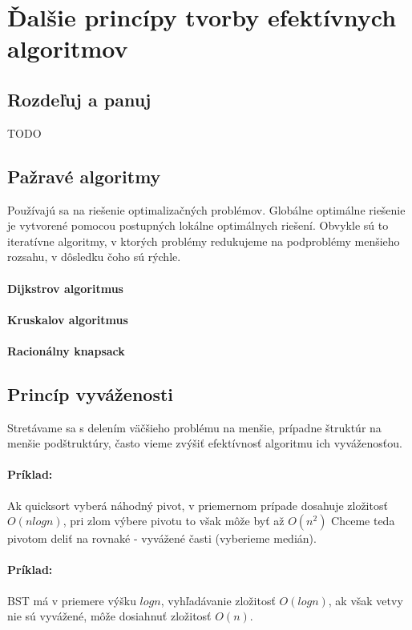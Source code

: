 \section{Ďalšie princípy tvorby efektívnych algoritmov}
	\subsection{Rozdeľuj a panuj}
	TODO
	\subsection{Pažravé algoritmy}
		Používajú sa na riešenie optimalizačných problémov. Globálne optimálne riešenie je vytvorené pomocou postupných lokálne optimálnych riešení. Obvykle sú to iteratívne algoritmy, v ktorých problémy redukujeme na podproblémy menšieho rozsahu, v dôsledku čoho sú rýchle.
		\paragraph{Dijkstrov algoritmus}
		\paragraph{Kruskalov algoritmus}
		\paragraph{Racionálny knapsack}
	\subsection{Princíp vyváženosti}
		Stretávame sa s delením väčšieho problému na menšie, prípadne štruktúr na menšie podštruktúry, často vieme zvýšiť efektívnosť algoritmu ich vyváženosťou.
		\paragraph{Príklad:} Ak quicksort vyberá náhodný pivot, v priemernom prípade dosahuje zložitosť $O(n log n)$, pri zlom výbere pivotu to však môže byť až $O(n^{2})$ Chceme teda pivotom deliť na rovnaké - vyvážené časti (vyberieme medián).\\
		\paragraph{Príklad:} BST má v priemere výšku $log n$, vyhľadávanie zložitosť $O(log n)$, ak však vetvy nie sú vyvážené, môže dosiahnuť zložitosť $O(n)$.
	

